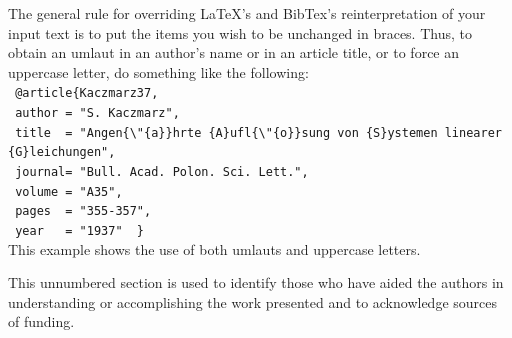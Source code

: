 \documentclass[]{spie}  %
\begin{document}
The general rule for overriding LaTeX's and BibTex's reinterpretation of your input text is to put the items you wish to be unchanged in braces. Thus, to obtain an umlaut in an author's name or in an article title, or to force an uppercase letter, do something like the following: \\[1ex]
\verb+ @article{Kaczmarz37,+ \\ 
\verb+ author = "S. Kaczmarz",+ \\ 
\verb+ title  = "Angen{\"{a}}hrte {A}ufl{\"{o}}sung von {S}ystemen linearer {G}leichungen",+ \\ 
\verb+ journal= "Bull. Acad. Polon. Sci. Lett.",+ \\ 
\verb+ volume = "A35",+ \\ 
\verb+ pages  = "355-357",+ \\	
\verb+ year   = "1937"	} + \\[1ex]
This example shows the use of both umlauts and uppercase letters.
\acknowledgments     %
 
This unnumbered section is used to identify those who have aided the authors in understanding or accomplishing the work presented and to acknowledge sources of funding.  


\end{document}
